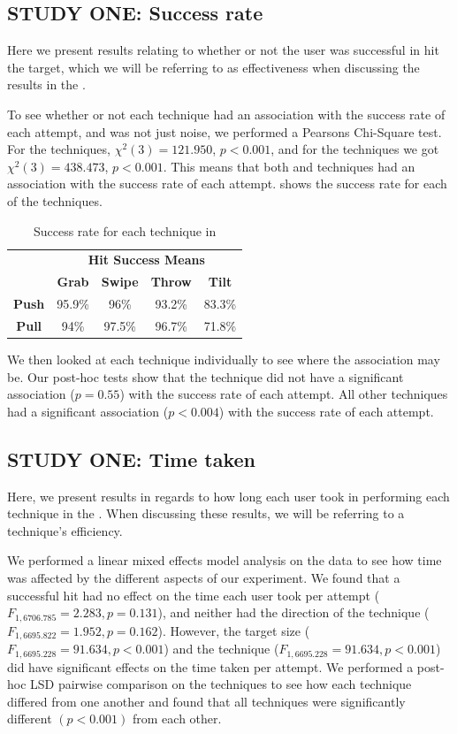 \subsection{STUDY ONE: Success rate}
Here we present results relating to whether or not the user was successful in hit the target, which we will be referring to as effectiveness when discussing the results in the \target. 

To see whether or not each technique had an association with the success rate of each attempt, and was not just noise, we performed a Pearsons Chi-Square test.
For the \push techniques, $\chi^2(3)=121.950$, $p<0.001$, and for the \pull techniques we got $\chi^2(3)=438.473$, $p<0.001$. 
This means that both \push and \pull techniques had an association with the success rate of each attempt.
 shows the success rate for each of the techniques. 

\begin{table}[H]
	\centering
	\def\arraystretch{1.5}
		\begin{tabular}{c c c c c}
			& \multicolumn{4}{c}{\textbf{Hit Success Means}} \\
			\cline{2-5}
			& \textbf{Grab} & \textbf{Swipe} & \textbf{Throw} & \textbf{Tilt} \\ \hline
			\textbf{Push} & 95.9\% & 96\% & 93.2\% & 83.3\% \\ \hline
			\textbf{Pull} & 94\% & 97.5\% & 96.7\% & 71.8\% \\ \hline
		\end{tabular}
	\caption{Success rate for each technique in \studyone}
	\label{tab:successRate}
\end{table}

We then looked at each technique individually to see where the association may be.
Our post-hoc tests show that the \throw \push technique did not have a significant association ($p=0.55$) with the success rate of each attempt.
All other techniques had a significant association ($p<0.004$) with the success rate of each attempt. 

\subsection{STUDY ONE: Time taken}
Here, we present results in regards to how long each user took in performing each technique in the \target. 
When discussing these results, we will be referring to a technique's efficiency.

We performed a linear mixed effects model analysis on the data to see how time was affected by the different aspects of our experiment. 
We found that a successful hit had no effect on the time each user took per attempt ($F_{1,6706.785} = 2.283, p = 0.131$), and neither had the direction of the technique ($F_{1,6695.822} = 1.952, p = 0.162$). 
However, the target size ($F_{1,6695.228} = 91.634, p < 0.001$) and the technique  ($F_{1,6695.228} = 91.634, p < 0.001$) did have significant effects on the time taken per attempt. 
We performed a post-hoc LSD pairwise comparison on the techniques to see how each technique differed from one another and found that all techniques were significantly different $(p<0.001)$ from each other. 

